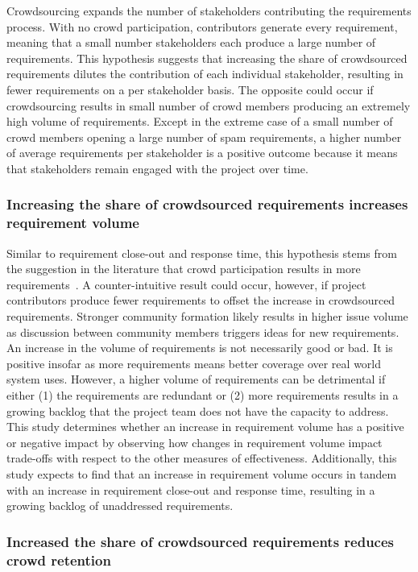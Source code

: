 Crowdsourcing expands the number of stakeholders contributing the requirements process. With no crowd participation, contributors generate every requirement, meaning that a small number stakeholders each produce a large number of requirements. This hypothesis suggests that increasing the share of crowdsourced requirements dilutes the contribution of each individual stakeholder, resulting in fewer requirements on a per stakeholder basis. The opposite could occur if crowdsourcing results in small number of crowd members producing an extremely high volume of requirements. Except in the extreme case of a small number of crowd members opening a large number of spam requirements, a higher number of average requirements per stakeholder is a positive outcome because it means that stakeholders remain engaged with the project over time.

\subsubsection{Increasing the share of crowdsourced requirements increases requirement volume}

Similar to requirement close-out and response time, this hypothesis stems from the suggestion in the literature that crowd participation results in more requirements~\cite{gerth}. A counter-intuitive result could occur, however, if project contributors produce fewer requirements to offset the increase in crowdsourced requirements. Stronger community formation likely results in higher issue volume as discussion between community members triggers ideas for new requirements. An increase in the volume of requirements is not necessarily good or bad. It is positive insofar as more requirements means better coverage over real world system uses. However, a higher volume of requirements can be detrimental if either (1) the requirements are redundant or (2) more requirements results in a growing backlog that the project team does not have the capacity to address. This study determines whether an increase in requirement volume has a positive or negative impact by observing how changes in requirement volume impact trade-offs with respect to the other measures of effectiveness. Additionally, this study  expects to find that an increase in requirement volume occurs in tandem with an increase in requirement close-out and response time, resulting in a growing backlog of unaddressed requirements. 

\subsubsection{Increased the share of crowdsourced requirements reduces crowd retention}

